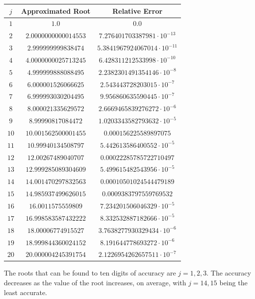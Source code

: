 \documentclass{article}
\begin{document}
\begin{center}
    \begin{tabular}{|c|c|c|}
        \hline
        $j$ & Approximated Root & Relative Error \\
        \hline
        $1$ & $1.0$ & $0.0$ \\
        \hline
        $2$ & $2.0000000000014553$ & $7.276401703387981 \cdot 10^{-13}$ \\
        \hline
        $3$ & $2.999999999838474$ & $5.3841967924067014 \cdot 10^{-11}$ \\
        \hline
        $4$ & $4.0000000025713245$ & $6.428311212533998 \cdot 10^{-10}$ \\
        \hline
        $5$ & $4.999999888088495$ & $2.2382301491354146 \cdot 10^{-8}$ \\
        \hline
        $6$ & $6.000001526066625$ & $2.543443728203015 \cdot 10^{-7}$ \\
        \hline
        $7$ & $6.999993030204495$ & $9.956860635590445 \cdot 10^{-7}$ \\
        \hline
        $8$ & $8.000021335629572$ & $2.6669465839276272 \cdot 10^{-6}$ \\
        \hline
        $9$ & $8.99990817084472$ & $1.0203343582793632 \cdot 10^{-5}$ \\
        \hline
        $10$ & $10.001562500001455$ & $0.000156225589897075$ \\
        \hline
        $11$ & $10.99940134508797$ & $5.442613586400552 \cdot 10^{-5}$ \\
        \hline
        $12$ & $12.00267489040707$ & $0.00022285785722710497$ \\
        \hline
        $13$ & $12.999285089304609$ & $5.499615482543956 \cdot 10^{-5}$ \\
        \hline
        $14$ & $14.001470297832563$ & $0.00010501024544479189$ \\
        \hline
        $15$ & $14.985937499626015$ & $0.0009383797559769532$ \\
        \hline
        $16$ & $16.0011575559809$ & $7.234201506046329 \cdot 10^{-5}$ \\
        \hline
        $17$ & $16.998583587432222$ & $8.332532887182666 \cdot 10^{-5}$ \\
        \hline
        $18$ & $18.00006774915527$ & $3.7638277930329434 \cdot 10^{-6}$ \\
        \hline
        $19$ & $18.999844360024152$ & $8.191644778693272 \cdot 10^{-6}$ \\
        \hline
        $20$ & $20.000004245391754$ & $2.1226954262657511 \cdot 10^{-7}$ \\
        \hline
    \end{tabular}
\end{center}
The roots that can be found to ten digits of accuracy are $j = 1, 2, 3$. The accuracy decreases as the value of the root increases, on average, with $j = 14, 15$ being the least accurate.
\end{document}
